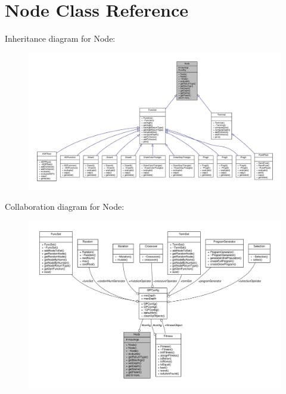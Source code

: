 \hypertarget{classNode}{}\section{Node Class Reference}
\label{classNode}


Inheritance diagram for Node\+:
\nopagebreak
\begin{figure}[H]
\begin{center}
\leavevmode
\includegraphics[width=350pt]{classNode__inherit__graph}
\end{center}
\end{figure}


Collaboration diagram for Node\+:
\nopagebreak
\begin{figure}[H]
\begin{center}
\leavevmode
\includegraphics[width=350pt]{classNode__coll__graph}
\end{center}
\end{figure}
